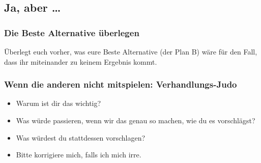 \subsection{Ja, aber \ldots}

\subsubsection{Die \glqq Beste Alternative\grqq{} überlegen}

Überlegt euch vorher, was eure \glqq Beste Alternative\grqq{} (der \glqq Plan B\grqq) wäre für den Fall, dass ihr miteinander zu keinem Ergebnis kommt.

\subsubsection{Wenn die anderen nicht mitspielen: Verhandlungs-Judo}

\begin{itemize}
    \item Warum ist dir das wichtig?
    \item Was würde passieren, wenn wir das genau so machen, wie du es vorschlägst?
    \item Was würdest du stattdessen vorschlagen?
    \item Bitte korrigiere mich, falls ich mich irre.
\end{itemize}
